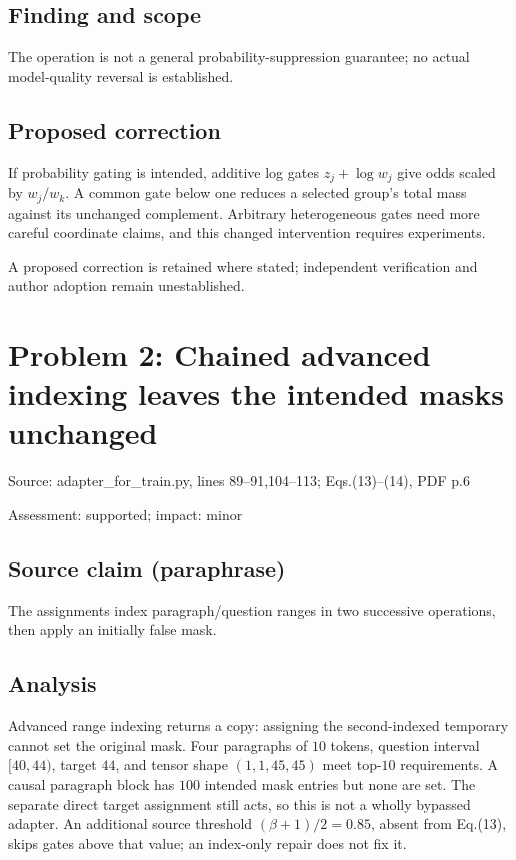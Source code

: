 \documentclass[11pt]{article}
\begin{document}
\subsection*{Finding and scope}

The operation is not a general probability-suppression guarantee; no actual model-quality reversal is established.

\subsection*{Proposed correction}

If probability gating is intended, additive log gates \(z_j+\log w_j\) give odds scaled by \(w_j/w_k\). A common gate below one reduces a selected group’s total mass against its unchanged complement. Arbitrary heterogeneous gates need more careful coordinate claims, and this changed intervention requires experiments.

A proposed correction is retained where stated; independent verification and author adoption remain unestablished.

\section*{Problem 2: Chained advanced indexing leaves the intended masks unchanged}

Source: adapter\_for\_train.py, lines 89–91,104–113; Eqs.(13)–(14), PDF p.6

Assessment: supported; impact: minor

\subsection*{Source claim (paraphrase)}

The assignments index paragraph/question ranges in two successive operations, then apply an initially false mask.

\subsection*{Analysis}

Advanced range indexing returns a copy: assigning the second-indexed temporary cannot set the original mask. Four paragraphs of \(10\) tokens, question interval \([40,44)\), target \(44\), and tensor shape \((1,1,45,45)\) meet top-\(10\) requirements. A causal paragraph block has \(100\) intended mask entries but none are set. The separate direct target assignment still acts, so this is not a wholly bypassed adapter. An additional source threshold \((\beta+1)/2=0.85\), absent from Eq.(13), skips gates above that value; an index-only repair does not fix it.
\end{document}
